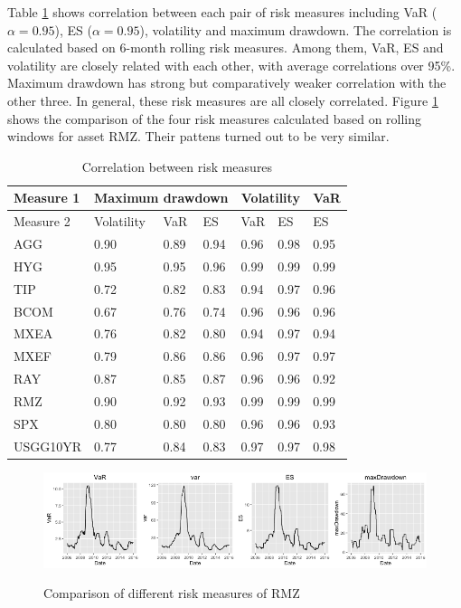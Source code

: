 \fi

Table \ref{table:corrRiskMeasure} shows correlation between each pair of risk measures including VaR ($\alpha = 0.95$), ES ($\alpha = 0.95$), volatility and maximum drawdown. The correlation is calculated based on 6-month rolling risk measures. Among them, VaR, ES and volatility are closely related with each other, with average correlations over 95\%. Maximum drawdown has strong but comparatively weaker correlation with the other three. In general, these risk measures are all closely correlated. Figure \ref{fig: risk_meausre_RMZ} shows the comparison of the four risk measures calculated based on rolling windows for asset RMZ. Their pattens turned out to be very similar.

\begin{table}[h]
\caption{Correlation between risk measures}
\centering 
\begin{tabular}{ p{2cm}||p{1.6cm}|p{1.6cm}|p{1.6cm}|p{1.6cm}|p{1.6cm}|p{1.6cm}} 
\hline
Measure 1 & \multicolumn{3}{|c|}{Maximum drawdown} & \multicolumn{2}{|c|}{Volatility} & VaR\\ \hline
Measure 2 & Volatility & VaR & ES & VaR & ES & ES\\
  \hline \hline
AGG & 0.90 & 0.89 & 0.94 & 0.96 & 0.98 & 0.95\\ 
HYG & 0.95 & 0.95 & 0.96 & 0.99 & 0.99 & 0.99\\ 
TIP & 0.72 & 0.82 & 0.83 & 0.94 & 0.97 & 0.96\\ 
BCOM & 0.67 & 0.76 & 0.74 & 0.96 & 0.96 & 0.96\\
MXEA & 0.76 & 0.82 & 0.80 & 0.94 & 0.97 & 0.94\\ 
MXEF & 0.79 & 0.86 & 0.86 & 0.96 & 0.97 & 0.97\\ 
RAY & 0.87 & 0.85 & 0.87 & 0.96 & 0.96 & 0.92\\ 
RMZ & 0.90 & 0.92 & 0.93 & 0.99 & 0.99 & 0.99\\ 
SPX & 0.80 & 0.80 & 0.80 & 0.96 & 0.96 & 0.93\\ 
USGG10YR & 0.77 & 0.84 & 0.83 & 0.97 & 0.97 & 0.98\\ 
\hline
\end{tabular}
\label{table:corrRiskMeasure}
\end{table}

\begin{figure}[h]
\caption{Comparison of different risk measures of RMZ} 
\centering 
\includegraphics[width = 1\textwidth]{../results/risk_measure_RMZ}
\label{fig: risk_meausre_RMZ}
\end{figure}


